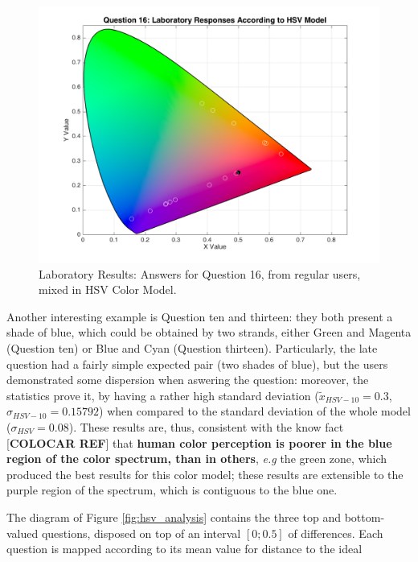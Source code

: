 \begin{enumerate}
\begin{figure}[!htbp]
\begin{minipage}{0.48\textwidth}
      \includegraphics[width=\textwidth]{images/results/16_lab_HSVresponses.png}
      \caption[Laboratory Results: Answers for Question 16, from regular users, mixed in HSV Color Model.]{Laboratory Results: Answers for Question 16, from regular users, mixed in HSV Color Model.}
      \label{fig:labhsvregular_16}
    \end{minipage}
  \end{figure}
\end{enumerate} \par
%
Another interesting example is Question ten and thirteen: they both present a shade of blue, which could be obtained by two strands, either Green and Magenta (Question ten) or Blue and Cyan (Question thirteen). Particularly, the
late question had a fairly simple expected pair (two shades of blue), but the users demonstrated some dispersion when aswering the question: moreover, the statistics prove it, by having a rather high standard deviation
($\tilde{x}_{HSV-10} = 0.3$, $\sigma_{HSV-10} = 0.15792$) when compared to the standard deviation of the whole model ($\sigma_{HSV} = 0.08$). These results are, thus, consistent with the know fact [\textbf{COLOCAR REF}] that
\textbf{human color perception is poorer in the blue region of the color spectrum, than in others}, \emph{e.g} the green zone, which produced the best results for this color model; these results are extensible to the purple region
of the spectrum, which is contiguous to the blue one. \par
%
The diagram of Figure \ref{fig:hsv_analysis} contains the three top and bottom-valued questions, disposed on top of an interval $[0 ; 0.5]$ of differences. Each question is mapped according to its mean value for distance to the ideal
